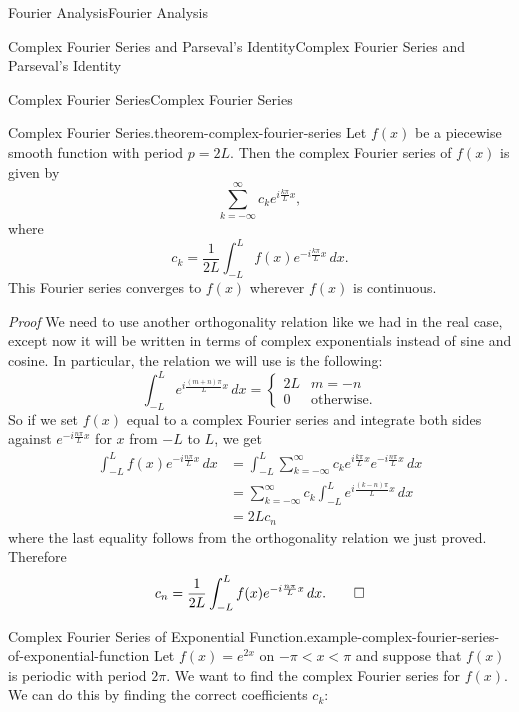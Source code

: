 \documentclass[10pt,]{book}
\makeatletter
\renewcommand*{\proofname}{Proof}
\renewenvironment{proof}[1][\proofname]{\par
  \pushQED{\qed}%
  \normalfont \topsep6\p@\@plus6\p@\relax
  \trivlist
  \item\relax
    {\itshape
    #1\@addpunct{.}}\hspace\labelsep\ignorespaces
}{%
  \popQED\endtrivlist\@endpefalse
}
\numberwithin{equation}{section}
\makeatother
\begin{document}
\begin{chapterptx}{Fourier Analysis}{}{Fourier Analysis}{}{}
\begin{sectionptx}{Complex Fourier Series and Parseval's Identity}{}{Complex Fourier Series and Parseval's Identity}{}{}
\begin{subsectionptx}{Complex Fourier Series}{}{Complex Fourier Series}{}{}
\begin{theorem}{Complex Fourier Series.}{}{theorem-complex-fourier-series}
\hypertarget{p-410}{}%
Let \(f(x)\) be a piecewise smooth function with period \(p=2L\). Then the complex Fourier series of \(f(x)\) is given by%
\begin{equation*}
\sum_{k=-\infty}^{\infty}c_{k}e^{i\frac{k\pi}{L}x},
\end{equation*}
where%
\begin{equation*}
c_{k} = \frac{1}{2L}\int_{-L}^{L}f(x)e^{-i\frac{k\pi}{L}x}\,dx.
\end{equation*}
This Fourier series converges to \(f(x)\) wherever \(f(x)\) is continuous.%
\end{theorem}
\begin{proof}\hypertarget{proof-2}{}
\hypertarget{p-411}{}%
We need to use another orthogonality relation like we had in the real case, except now it will be written in terms of complex exponentials instead of sine and cosine. In particular, the relation we will use is the following:%
\begin{equation*}
\int_{-L}^{L}e^{i\frac{(m+n)\pi}{L}x}\,dx = \begin{cases} 2L & m=-n \\ 0 & \text{otherwise.}\end{cases}
\end{equation*}
So if we set \(f(x)\) equal to a complex Fourier series and integrate both sides against \(e^{-i\frac{n\pi}{L}x}\) for \(x\) from \(-L\) to \(L\), we get%
\begin{align*}
\int_{-L}^{L}f(x)e^{-i\frac{n\pi}{L}x}\,dx & = \int_{-L}^{L}\sum_{k=-\infty}^{\infty}c_{k}e^{i\frac{k\pi}{L}x}e^{-i\frac{n\pi}{L}x}\,dx \\
&= \sum_{k=-\infty}^{\infty}c_{k}\int_{-L}^{L}e^{i\frac{(k-n)\pi}{L}x}\,dx\\
&= 2Lc_{n}
\end{align*}
where the last equality follows from the orthogonality relation we just proved. Therefore%
\begin{equation*}
c_{n} = \frac{1}{2L}\int_{-L}^{L}f(x)e^{-i\frac{n\pi}{L}x}\,dx.\qedhere
\end{equation*}
%
\end{proof}
\begin{example}{Complex Fourier Series of Exponential Function.}{example-complex-fourier-series-of-exponential-function}%
\hypertarget{p-412}{}%
Let \(f(x) = e^{2x}\) on \(-\pi<x<\pi\) and suppose that \(f(x)\) is periodic with period \(2\pi\). We want to find the complex Fourier series for \(f(x)\). We can do this by finding the correct coefficients \(c_{k}\):%

\end{example}
\end{subsectionptx}
\end{sectionptx}
\end{chapterptx}
\end{document}
